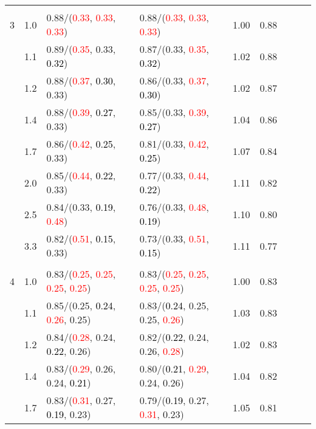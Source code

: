 \documentclass[10pt,a4paper]{report}
\begin{document}
\begin{table}[!htbp]
\begin{center}
{\begin{tabular}{ccllccccc}
			&&&&\\
			3			&1.0&0.88/(\textcolor{red}{0.33}, \textcolor{red}{0.33}, \textcolor{red}{0.33})&0.88/(\textcolor{red}{0.33}, \textcolor{red}{0.33}, \textcolor{red}{0.33})&1.00&0.88\\
			&1.1&0.89/(\textcolor{red}{0.35}, 0.33, \textcolor{black}{0.32})&0.87/(0.33, \textcolor{red}{0.35}, \textcolor{black}{0.32})&1.02&0.88\\
			&1.2&0.88/(\textcolor{red}{0.37}, \textcolor{black}{0.30}, 0.33)&0.86/(0.33, \textcolor{red}{0.37}, \textcolor{black}{0.30})&1.02&0.87\\
			&1.4&0.88/(\textcolor{red}{0.39}, \textcolor{black}{0.27}, 0.33)&0.85/(0.33, \textcolor{red}{0.39}, \textcolor{black}{0.27})&1.04&0.86\\
			&1.7&0.86/(\textcolor{red}{0.42}, \textcolor{black}{0.25}, 0.33)&0.81/(0.33, \textcolor{red}{0.42}, \textcolor{black}{0.25})&1.07&0.84\\
			&2.0&0.85/(\textcolor{red}{0.44}, \textcolor{black}{0.22}, 0.33)&0.77/(0.33, \textcolor{red}{0.44}, \textcolor{black}{0.22})&1.11&0.82\\
			&2.5&0.84/(0.33, \textcolor{black}{0.19}, \textcolor{red}{0.48})&0.76/(0.33, \textcolor{red}{0.48}, \textcolor{black}{0.19})&1.10&0.80\\
			&3.3&0.82/(\textcolor{red}{0.51}, \textcolor{black}{0.15}, 0.33)&0.73/(0.33, \textcolor{red}{0.51}, \textcolor{black}{0.15})&1.11&0.77\\
			&&&&\\
			4			&1.0&0.83/(\textcolor{red}{0.25}, \textcolor{red}{0.25}, \textcolor{red}{0.25}, \textcolor{red}{0.25})&0.83/(\textcolor{red}{0.25}, \textcolor{red}{0.25}, \textcolor{red}{0.25}, \textcolor{red}{0.25})&1.00&0.83\\
			&1.1&0.85/(0.25, \textcolor{black}{0.24}, \textcolor{red}{0.26}, 0.25)&0.83/(\textcolor{black}{0.24}, 0.25, 0.25, \textcolor{red}{0.26})&1.03&0.83\\
			&1.2&0.84/(\textcolor{red}{0.28}, 0.24, \textcolor{black}{0.22}, 0.26)&0.82/(\textcolor{black}{0.22}, 0.24, 0.26, \textcolor{red}{0.28})&1.02&0.83\\
			&1.4&0.83/(\textcolor{red}{0.29}, 0.26, 0.24, \textcolor{black}{0.21})&0.80/(\textcolor{black}{0.21}, \textcolor{red}{0.29}, 0.24, 0.26)&1.04&0.82\\
			&1.7&0.83/(\textcolor{red}{0.31}, 0.27, \textcolor{black}{0.19}, 0.23)&0.79/(\textcolor{black}{0.19}, 0.27, \textcolor{red}{0.31}, 0.23)&1.05&0.81\\

\end{tabular}}
\end{center}
\end{table}
\end{document}
